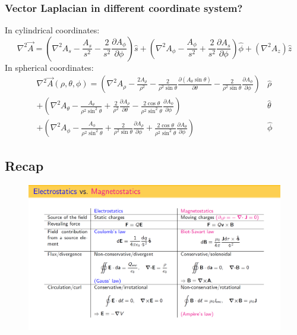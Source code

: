 \documentclass[12pt,a4paper,twoside]{article}
\numberwithin{equation}{section}
\begin{document}
\subsubsection{Vector Laplacian in different coordinate system?}
In cylindrical coordinates:
\begin{equation*}
    \nabla^2\overrightarrow{A}=\left(\nabla^2A_s-\frac{A_s}{s^2}-\frac{2}{s^2}\frac{\partial A_\phi}{\partial \phi}\right)\hat{s} + \left(\nabla^2A_\phi-\frac{A_\phi}{s^2}+\frac{2}{s^2}\frac{\partial A_s}{\partial \phi}\right)\hat{\phi}+(\nabla^2A_z)\hat{z}
\end{equation*}
In spherical coordinates:
\begin{equation*}
    {\begin{aligned}\nabla^2\overrightarrow{A}(\rho,\theta,\phi)=\left(\nabla ^{2}A_{\rho}-{\frac {2A_{\rho}}{\rho^{2}}}-{\frac {2}{\rho^{2}\sin \theta }}{\frac {\partial \left(A_{\theta }\sin \theta \right)}{\partial \theta }}-{\frac {2}{\rho^{2}\sin \theta }}{\frac {\partial A_{\phi }}{\partial \phi }}\right)&{\hat {\rho}}\\+\left(\nabla ^{2}A_{\theta }-{\frac {A_{\theta }}{\rho^{2}\sin ^{2}\theta }}+{\frac {2}{\rho^{2}}}{\frac {\partial A_{\rho}}{\partial \theta }}-{\frac {2\cos \theta }{\rho^{2}\sin ^{2}\theta }}{\frac {\partial A_{\phi }}{\partial \phi }}\right)&{\hat {{\theta }}}\\+\left(\nabla ^{2}A_{\phi }-{\frac {A_{\phi }}{\rho^{2}\sin ^{2}\theta }}+{\frac {2}{\rho^{2}\sin \theta }}{\frac {\partial A_{\rho}}{\partial \phi }}+{\frac {2\cos \theta }{\rho^{2}\sin ^{2}\theta }}{\frac {\partial A_{\theta }}{\partial \phi }}\right)&{\hat {\phi }}\end{aligned}}
\end{equation*}
\subsection{Recap}
\begin{figure}[ht]
    \centering
    \includegraphics[width=15.7cm]{250-Revision/statics-recap.png}
\end{figure}
\newpage
\end{document}
